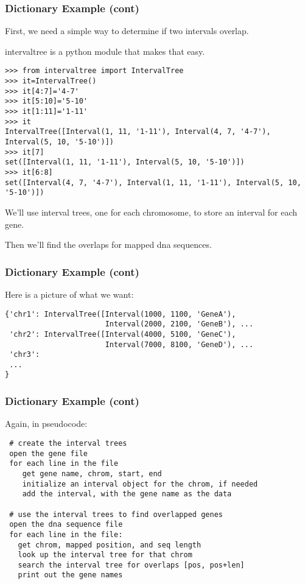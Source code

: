 \documentclass[10pt]{beamer}
\newcommand\smallfont{\fontsize{8pt}{7.2}\selectfont}
\begin{document}
\begin{frame}[fragile]
\frametitle{Dictionary Example (cont)}

First, we need a simple way to determine if two intervals overlap.  
\vspace{2mm}

intervaltree is a python module that makes that easy.

\smallfont
\begin{verbatim}
>>> from intervaltree import IntervalTree
>>> it=IntervalTree()
>>> it[4:7]='4-7'
>>> it[5:10]='5-10'
>>> it[1:11]='1-11'
>>> it
IntervalTree([Interval(1, 11, '1-11'), Interval(4, 7, '4-7'), Interval(5, 10, '5-10')])
>>> it[7]
set([Interval(1, 11, '1-11'), Interval(5, 10, '5-10')])
>>> it[6:8]
set([Interval(4, 7, '4-7'), Interval(1, 11, '1-11'), Interval(5, 10, '5-10')]) 
\end{verbatim}

We'll use interval trees, one for each chromosome, to store an interval for each gene.
\vspace{2mm}

Then we'll find the overlaps for mapped dna sequences.

\end{frame}

\begin{frame}[fragile]
\frametitle{Dictionary Example (cont)}

Here is a picture of what we want:

\smallfont
\begin{verbatim}
{'chr1': IntervalTree([Interval(1000, 1100, 'GeneA'), 
                       Interval(2000, 2100, 'GeneB'), ...
 'chr2': IntervalTree([Interval(4000, 5100, 'GeneC'), 
                       Interval(7000, 8100, 'GeneD'), ...
 'chr3':
 ...
}
\end{verbatim}

\end{frame}


\begin{frame}[fragile]
\frametitle{Dictionary Example (cont)}
\smallfont
Again, in pseudocode:
\begin{verbatim}
 # create the interval trees
 open the gene file
 for each line in the file
    get gene name, chrom, start, end
    initialize an interval object for the chrom, if needed
    add the interval, with the gene name as the data

 # use the interval trees to find overlapped genes
 open the dna sequence file
 for each line in the file:
   get chrom, mapped position, and seq length
   look up the interval tree for that chrom
   search the interval tree for overlaps [pos, pos+len]
   print out the gene names

\end{verbatim}
\end{frame}
\end{document}
